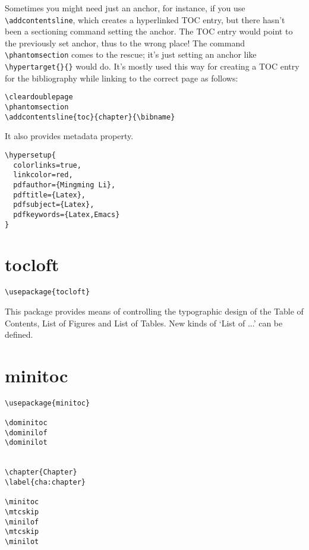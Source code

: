 Sometimes you might need just an anchor, for instance, if you use \lstinline|\addcontentsline|, which creates a hyperlinked TOC entry, but there hasn't been a sectioning command setting the anchor.
The TOC entry would point to the previously set anchor, thus to the wrong place! The command \lstinline|\phantomsection| comes to the rescue; it's just setting an anchor like \lstinline|\hypertarget{}{}| would do.
It's mostly used this way for creating a TOC entry for the bibliography while linking to the correct page as follows:
\begin{lstlisting}
\cleardoublepage
\phantomsection
\addcontentsline{toc}{chapter}{\bibname}

\end{lstlisting}



It also provides metadata property.
\begin{lstlisting}
\hypersetup{
  colorlinks=true,
  linkcolor=red,
  pdfauthor={Mingming Li},
  pdftitle={Latex},
  pdfsubject={Latex},
  pdfkeywords={Latex,Emacs}
}
\end{lstlisting}





\section{tocloft}
\label{sec:tocloft}
\begin{lstlisting}
\usepackage{tocloft}
\end{lstlisting}

This package provides means of controlling the typographic design of the Table of Contents, List of Figures and List of Tables.
New kinds of ‘List of ...’ can be defined.


\section{minitoc}
\label{sec:minitoc}
\begin{lstlisting}
\usepackage{minitoc}

\dominitoc
\dominilof
\dominilot


\chapter{Chapter}
\label{cha:chapter}

\minitoc                        
\mtcskip
\minilof
\mtcskip
\minilot

\end{lstlisting}

